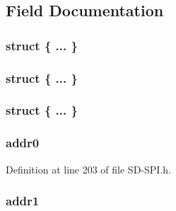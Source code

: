 \subsection{Field Documentation}
\hypertarget{union_c_m_d___p_a_c_k_e_t_a7185d7a15bc1e97687b18409a53faa92}{}\subsubsection[{"@13}]{\setlength{\rightskip}{0pt plus 5cm}struct \{ ... \} }\label{union_c_m_d___p_a_c_k_e_t_a7185d7a15bc1e97687b18409a53faa92}
\hypertarget{union_c_m_d___p_a_c_k_e_t_a1ce5a5c4a41684bad2c2f5e1811f4734}{}\subsubsection[{"@15}]{\setlength{\rightskip}{0pt plus 5cm}struct \{ ... \} }\label{union_c_m_d___p_a_c_k_e_t_a1ce5a5c4a41684bad2c2f5e1811f4734}
\hypertarget{union_c_m_d___p_a_c_k_e_t_aead86781aa21081db044cfe0c590d38e}{}\subsubsection[{"@17}]{\setlength{\rightskip}{0pt plus 5cm}struct \{ ... \} }\label{union_c_m_d___p_a_c_k_e_t_aead86781aa21081db044cfe0c590d38e}
\hypertarget{union_c_m_d___p_a_c_k_e_t_ae38bd1ccf861cb1852b270379a8ef37d}{}
\subsubsection[{addr0}]{ addr0}\label{union_c_m_d___p_a_c_k_e_t_ae38bd1ccf861cb1852b270379a8ef37d}


Definition at line 203 of file S\+D-\/\+S\+P\+I.\+h.

\hypertarget{union_c_m_d___p_a_c_k_e_t_a54a1f1c0e35bb6576bb52ba552955472}{}
\subsubsection[{addr1}]{ addr1}\label{union_c_m_d___p_a_c_k_e_t_a54a1f1c0e35bb6576bb52ba552955472}


